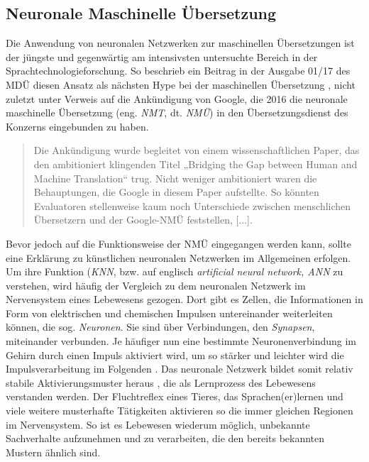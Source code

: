
\subsection{Neuronale Maschinelle Übersetzung}

\label{K3:subsec:NMT}


\begin{sloppypar}
Die Anwendung von neuronalen Netzwerken zur maschinellen Übersetzungen ist der jüngste und gegenwärtig am intensivsten untersuchte Bereich in der Sprachtechnologieforschung. So beschrieb ein Beitrag in der Ausgabe 01/17 des MDÜ diesen Ansatz als nächsten \glqq Hype bei der maschinellen Übersetzung\grqq{} \citep[38]{kruger_von_2017}, nicht zuletzt unter Verweis auf die Ankündigung von Google, die 2016 die neuronale maschinelle Übersetzung (eng. \emph{NMT}, dt. \emph{NMÜ}) in den Übersetzungsdienst des Konzerns eingebunden zu haben.\end{sloppypar}

\begin{quote}

Die Ankündigung wurde begleitet von einem wissenschaftlichen Paper, das den ambitioniert klingenden Titel „Bridging the Gap between Human and Machine Translation“ trug. Nicht weniger ambitioniert waren die Behauptungen, die Google in diesem Paper aufstellte. So könnten Evaluatoren stellenweise kaum noch Unterschiede zwischen menschlichen Übersetzern und der Google-NMÜ feststellen, [...]. \citep[38]{kruger_von_2017}

\end{quote}

Bevor jedoch auf die Funktionsweise der NMÜ eingegangen werden kann, sollte eine Erklärung zu künstlichen neuronalen Netzwerken im Allgemeinen erfolgen. Um ihre Funktion (\emph{KNN}, bzw. auf englisch \emph{artificial neural network, ANN} zu verstehen, wird häufig der Vergleich zu dem neuronalen Netzwerk im Nervensystem eines Lebewesens gezogen. Dort gibt es Zellen, die Informationen in Form von elektrischen und chemischen Impulsen untereinander weiterleiten können, die sog. \emph{Neuronen}. Sie sind über Verbindungen, den \emph{Synapsen}, miteinander verbunden. Je häufiger nun eine bestimmte Neuronenverbindung im Gehirn durch einen Impuls aktiviert wird, um so stärker und leichter wird die Impulsverarbeitung im Folgenden \citep[19\psq]{kriesel_kleiner_2005}. Das neuronale Netzwerk bildet somit \glqq relativ stabile Aktivierungsmuster heraus\grqq{} \citep[38]{kruger_von_2017}, die als Lernprozess des Lebewesens verstanden werden. Der Fluchtreflex eines Tieres, das Sprachen(er)lernen und viele weitere musterhafte Tätigkeiten aktivieren so die immer gleichen Regionen im Nervensystem. So ist es Lebewesen wiederum möglich, unbekannte Sachverhalte aufzunehmen und zu verarbeiten, die den bereits bekannten Mustern ähnlich sind.

